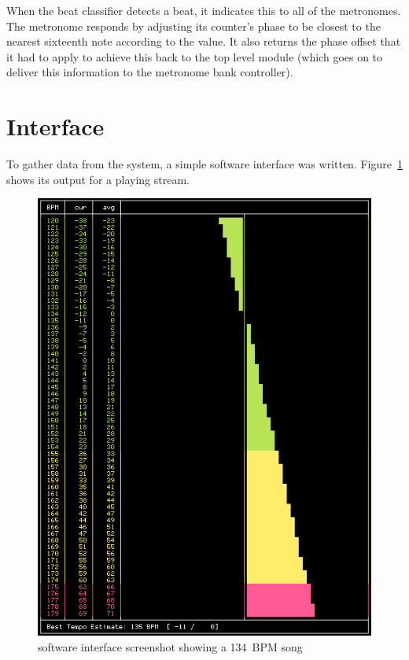 \documentclass[letterpaper]{article}
\begin{document}
        When the beat classifier detects a beat, it indicates this to all of the
        metronomes.  The metronome responds by adjusting its counter's phase to be
        closest to the nearest sixteenth note according to the 
        value.  It also returns the phase offset that it had to apply to achieve
        this back to the top level module (which goes on to deliver this
        information to the metronome bank controller).


\section{Interface}

    To gather data from the system, a simple software interface was written.
    Figure~\ref{fig:swss} shows its output for a playing stream.

    \begin{figure}
        \centering
        \includegraphics[scale=0.4]{fig/swss.png}
        \caption{software interface screenshot showing a 134~BPM song}
        \label{fig:swss}
    \end{figure}
\end{document}
